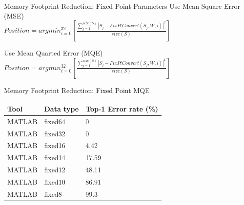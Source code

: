 \begin{frame}{Memory Footprint Reduction: Fixed Point Parameters}
	\large{Use Mean Square Error (MSE)}\\
	$Position = argmin_{i=0}^{32}[\frac{\sum_{j=1}^{size(S)} |S_j - FixPtConvert(S_j, W, i)|^2 }{size(S)}]$

	\large{Use Mean Quarted Error (MQE)}\\
	$Position = argmin_{i=0}^{32}[\frac{\sum_{j=1}^{size(S)} |S_j - FixPtConvert(S_j, W, i)|^4 }{size(S)}]$
\end{frame}

\begin{frame}{Memory Footprint Reduction: Fixed Point MQE}
	\begin{table}[H]
		\centering
		\begin{tabular}{lll}
			\toprule
			\textbf{Tool} & \textbf{Data type} & \textbf{Top-1 Error rate (\%)} \\
			\midrule
			MATLAB        & fixed64            & 0                              \\
			MATLAB        & fixed32            & 0                              \\
			MATLAB        & fixed16            & 4.42                           \\
			MATLAB        & fixed14            & 17.59                          \\
			MATLAB        & fixed12            & 48.11                          \\
			MATLAB        & fixed10            & 86.91                          \\
			MATLAB        & fixed8             & 99.3                           \\
			\bottomrule
		\end{tabular}
	\end{table}
\end{frame}

